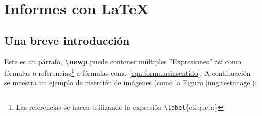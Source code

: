 %
%


\section{Informes con \LaTeX}

	\subsection{Una breve introducción}
	
		\lipsum[4]
		
		
		Este es un párrafo, \textbf{\textbackslash newp} puede contener múltiples ''Expresiones'' así como fórmulas o referencias\footnote{Las referencias se hacen utilizando la expresión \texttt{\textbackslash label}\{etiqueta\}} a fórmulas como \eqref{eqn:formulasinsentido}. A continuación se muestra un ejemplo de inserción de imágenes (como la Figura \ref{img:testimage}):
		
